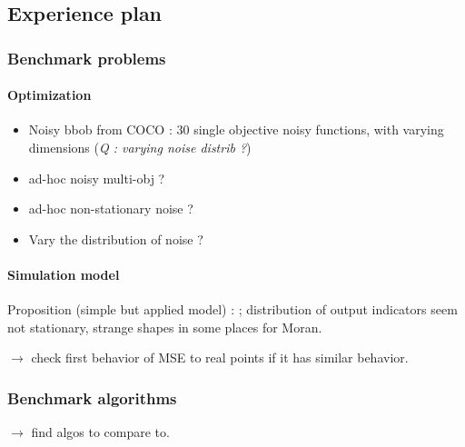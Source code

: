 \subsection{Experience plan}


\subsubsection{Benchmark problems}

\paragraph{Optimization}

\begin{itemize}
\item Noisy bbob from COCO \cite{2016arXiv160308776H} : 30 single objective noisy functions, with varying dimensions (\textit{Q : varying noise distrib ?})
\item ad-hoc noisy multi-obj ?
\item ad-hoc non-stationary noise ?
\item Vary the distribution of noise ?
\end{itemize}



\paragraph{Simulation model}

Proposition (simple but applied model) : \cite{2017arXiv170806743R} ; distribution of output indicators seem not stationary, strange shapes in some places for Moran.

$\rightarrow$ check first behavior of MSE to real points if it has similar behavior.


\subsubsection{Benchmark algorithms}

$\rightarrow$ find algos to compare to.

